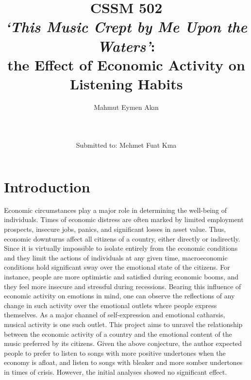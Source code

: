 \documentclass[12pt]{article}
\begin{document}
	\title{\textbf{CSSM 502} \\ \textit{‘This Music Crept by Me Upon the Waters’}: \\ the Effect of Economic Activity on Listening Habits }
	\author{
		Mahmut Eymen Akın \\
		\\
		\\
		\\
		Submitted to:
		Mehmet Fuat Kına}
	\date{}
	\maketitle{}
	\pagebreak
	\tableofcontents
	\pagebreak
\section{Introduction}
\begin{epigraphs}
\end{epigraphs}

Economic circumstances play a major role in determining the well-being of individuals. Times of economic distress are often marked by limited employment prospects, insecure jobs, panics, and significant losses in asset value. Thus, economic downturns affect all citizens of a country, either directly or indirectly. Since it is virtually impossible to isolate entirely from the economic conditions and they limit the actions of individuals at any given time, macroeconomic conditions hold significant sway over the emotional state of the citizens. For instance, people are more optimistic and satisfied during economic booms, and they feel more insecure and stressful during recessions. Bearing this influence of economic activity on emotions in mind, one can observe the reflections of any change in such activity over the emotional outlets where people express themselves. As a major channel of self-expression and emotional catharsis, musical activity is one such outlet. This project aims to unravel the relationship between the economic activity of a country and the emotional content of the music preferred by its citizens. Given the above conjecture, the author expected people to prefer to listen to songs with more positive undertones when the economy is afloat, and listen to songs with bleaker and more somber undertones in times of crisis. However, the initial analyses showed no significant effect.
\end{document}
